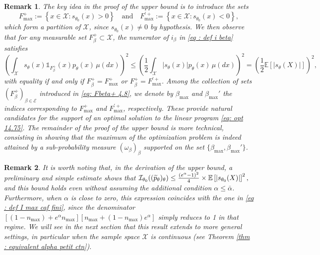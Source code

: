 \documentclass[a4paper, 11pt]{article}
\newtheorem{rem}{Remark}
\theoremstyle{definition}
\newcommand{\E}{{\mathbb{E}}}
\newcommand{\cI}{{\mathcal{I}}}
\newcommand{\indi}[1]{\mathds{1}_{#1}}
\DeclarePairedDelimiter{\abs}{\lvert}{\rvert}
\begin{document}
{\begin{rem}{\label{rk: choice Fmax}}
The key idea in the proof of the upper bound is to introduce the sets
\[
F_{\max}^+ := \left\{ x \in \mathcal{X} : s_{\theta_0}(x) > 0 \right\} \quad \text{and} \quad F_{\max}^{\prime +} := \left\{ x \in \mathcal{X} : s_{\theta_0}(x) < 0 \right\},
\]
which form a partition of \( \mathcal{X} \), since \( s_{\theta_0}(x) \neq 0 \) by hypothesis. We then observe that for any measurable set \( F_\beta^+ \subset \mathcal{X} \), the numerator of \( i_\beta \) in \eqref{eq : def i beta} satisfies
\[
\left( \int_\mathcal{X} s_\theta(x) \indi{F^+_\beta}(x) p_\theta(x) \, \mu(dx) \right)^2 \le \left( \frac{1}{2} \int_\mathcal{X} |s_\theta(x)| p_\theta(x) \, \mu(dx) \right)^2 = \left( \frac{1}{2} \mathbb{E}[|s_\theta(X)|] \right)^2,
\]
with equality if and only if \( F_\beta^+ = F_{\max}^+ \) or \( F_\beta^+ = F_{\max}^{\prime +} \). Among the collection of sets \( (F_\beta^+)_{\beta \in \mathcal{E}} \) introduced in \eqref{eq: Fbeta+ 4.8}, we denote by \( \beta_{\max} \) and \( \beta_{\max}' \) the indices corresponding to \( F_{\max}^+ \) and \( F_{\max}^{\prime +} \), respectively. These provide natural candidates for the support of an optimal solution to the linear program \eqref{eq: opt 14.75}. The remainder of the proof of the upper bound is more technical, consisting in showing that the maximum of the optimization problem is indeed attained by a sub-probability measure \( (\omega_\beta)_\beta \) supported on the set \( \{ \beta_{\max}, \beta_{\max}' \} \).
\end{rem}

\begin{rem}
It is worth noting that, in the derivation of the upper bound, a preliminary and simple estimate shows that
$
	\cI_{\theta_0}((\widetilde{p}_\theta)_\theta) \le 
	\frac{(e^\alpha-1)^2}{4} \times \E\left[\abs{s_{\theta_0}(X)}\right]^2,
	$
and this bound holds even without assuming the additional condition $\alpha \le \bar{\alpha}$. Furthermore, when $\alpha$ is close to zero, this expression coincides with the one in \eqref{eq : def I max caf fini}, since the denominator
$
	\left[ (1-n_\text{max})+e^\alpha n_\text{max}  \right]
	\left[n_\text{max}+(1-n_\text{max})e^\alpha   \right]
	$
simply reduces to 1 in that regime. We will see in the next section that this result extends to more general settings, in particular when the sample space $\mathcal{X}$ is continuous (see Theorem \ref{thm : equivalent alpha petit ctn}).
\end{rem}



























}
\end{document}
